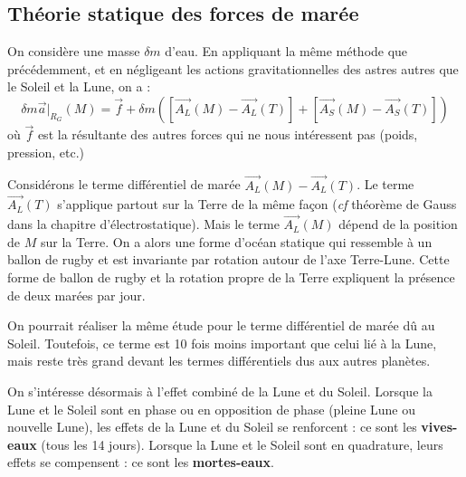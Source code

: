 \documentclass[french]{book}
\theoremstyle{plain}
\theoremstyle{definition}
\theoremstyle{remark}
\begin{document}
\subsection{Théorie statique des forces de marée}
On considère une masse $\delta m$ d'eau. En appliquant la même méthode que précédemment, et en négligeant les actions gravitationnelles des astres autres que le Soleil et la Lune, on a : $$\delta m\overrightarrow{a}\rvert_{R_G}(M)=\overrightarrow{f}+\delta m\left(\left[\overrightarrow{A_L}(M)-\overrightarrow{A_L}(T)\right]+\left[\overrightarrow{A_S}(M)-\overrightarrow{A_S}(T)\right]\right)$$ où $\overrightarrow{f}$ est la résultante des autres forces qui ne nous intéressent pas (poids, pression, etc.) \\ \par Considérons le terme différentiel de marée $\overrightarrow{A_L}(M)-\overrightarrow{A_L}(T)$. Le terme $\overrightarrow{A_L}(T)$ s'applique partout sur la Terre de la même façon (\textit{cf} théorème de Gauss dans la chapitre d'électrostatique). Mais le terme $\overrightarrow{A_L}(M)$ dépend de la position de $M$ sur la Terre. On a alors une forme d'océan statique qui ressemble à un ballon de rugby et est invariante par rotation autour de l'axe Terre-Lune. Cette forme de ballon de rugby et la rotation propre de la Terre expliquent la présence de deux marées par jour. \\ \par On pourrait réaliser la même étude pour le terme différentiel de marée dû au Soleil. Toutefois, ce terme est 10 fois moins important que celui lié à la Lune, mais reste très grand devant les termes différentiels dus aux autres planètes. \\ \par On s'intéresse désormais à l'effet combiné de la Lune et du Soleil. Lorsque la Lune et le Soleil sont en phase ou en opposition de phase (pleine Lune ou nouvelle Lune), les effets de la Lune et du Soleil se renforcent : ce sont les \textbf{vives-eaux} (tous les 14 jours). Lorsque la Lune et le Soleil sont en quadrature, leurs effets se compensent : ce sont les \textbf{mortes-eaux}.
\end{document}
